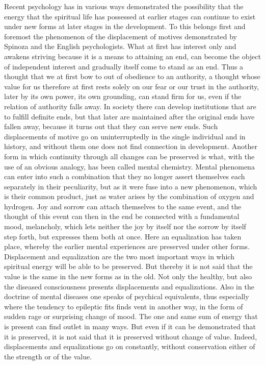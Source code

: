 \documentclass[12pt,a4paper,openany]{book}
\newcommand{\opage}[1]{\marginnote{\footnotesize\textit{[#1]}}}
\begin{document}
Recent psychology has in various ways demonstrated
the possibility that the energy that the spiritual life has possessed
at earlier stages can continue to exist under new forms
at later stages in the development. To this belongs first and foremost
the phenomenon of the displacement of motives demonstrated by Spinoza and the English psychologists.
What at first has interest only and
awakens striving because it is a means to attaining an end,
can become the object of independent interest and gradually
itself come to stand as an end. Thus a thought
that we at first bow to out of obedience to an authority, a thought
whose value for us therefore at first rests solely on our fear or
our trust in the authority, later by its own power,
its own grounding, can stand firm for us, even if
the relation of authority falls away. In society there can develop
institutions that are to fulfill definite ends, but that later
are maintained after the original ends have fallen
away, because it turns out that they can serve new ends. Such
\opage{229}displacements of motive go on uninterruptedly in the single
individual and in history, and without them one does not find
connection in development. Another form in which continuity
through all changes can be preserved is what, with
the use of an obvious analogy, has been called mental
chemistry. Mental phenomena can enter into such a
combination that they no longer assert themselves each
separately in their peculiarity, but as it were fuse
into a new phenomenon, which is their common product, just as
water arises by the combination of oxygen and hydrogen. Joy and
sorrow can attach themselves to the same event, and the thought of
this event can then in the end be connected with a
fundamental mood, melancholy, which lets neither the joy by itself
nor the sorrow by itself step forth, but expresses them both
at once. Here an equalization has taken place, whereby
the earlier mental experiences are preserved under other forms.
Displacement and equalization are the two most important ways in
which spiritual energy will be able to be preserved. But thereby
it is not said that the value is the same in the new forms
as in the old. Not only the healthy, but also the diseased
consciousness presents displacements and equalizations.
Also in the doctrine of mental diseases one speaks of psychical
equivalents, thus especially where the tendency to epileptic fits
finds vent in another way, in the form of sudden rage or
surprising change of mood. The one and same sum of
energy that is present can find outlet in many ways.
But even if it can be demonstrated that it is preserved, it is not
said that it is preserved without change of value. Indeed,
displacements and equalizations go on constantly, without conservation
either of the strength or of the value.
\end{document}
